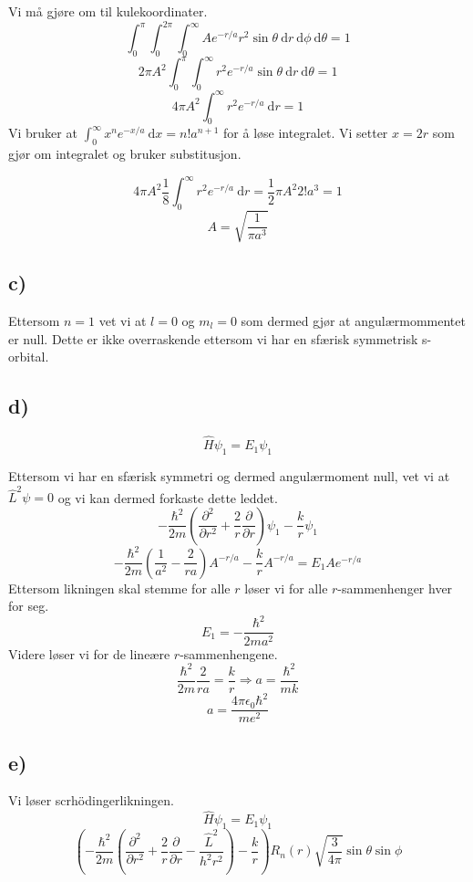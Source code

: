 \documentclass{article}
\begin{document}
Vi må gjøre om til kulekoordinater. 
\[
∫_{0}^{π} ∫_{0}^{2π} ∫_{0}^{∞} A e^{- r / a}r^2 \sin θ \ \mathrm{d}r \ \mathrm{d}ϕ \ \mathrm{d}θ = 1
\]
\[
2πA^2 ∫_{0}^{π} ∫_{0}^{∞} r^2 e^{-r / a} \sin θ \ \mathrm{d}r \ \mathrm{d}θ = 1
\]
\[
4πA^2 ∫_{0}^{∞} r^2 e^{-r / a} \ \mathrm{d}r = 1
\]
Vi bruker at $∫_{0}^{∞} x^{n} e^{- x / a} \ \mathrm{d}x = n! a^{n + 1}$ for å løse integralet. Vi setter $x = 2r$ som gjør om integralet og bruker substitusjon. 

\[
4πA^2 \frac{1}{8} ∫_{0}^{∞} r^2 e^{-r / a} \ \mathrm{d}r = \frac{1}{2} πA^2 2! a^3 = 1
\]
\[
A = \sqrt{\frac{1}{πa^3}}
\]


\subsection*{c)}
Ettersom $n=1$ vet vi at $l=0$ og $m_l=0$ som dermed gjør at angulærmommentet er null. Dette er ikke overraskende ettersom vi har en sfærisk symmetrisk s-orbital.


\subsection*{d)}
\[
\hat{H} ψ_{1} = E_1 ψ_{1}
\]

Ettersom vi har en sfærisk symmetri og dermed angulærmoment null, vet vi at $\hat{L}^2 ψ = 0$ og vi kan dermed forkaste dette leddet. 
\[
- \frac{ℏ^2}{2m} \left(\frac{∂^2 }{∂ r^2} + \frac{2}{r} \frac{∂ }{∂ r}\right)ψ_1 - \frac{k}{r}ψ_1
\]
\[
- \frac{ℏ^2}{2m}\left(\frac{1}{a^2} - \frac{2}{ra}\right)A^{- r / a} - \frac{k}{r}A^{- r/ a} = E_1 Ae^{- r / a}
\]
Ettersom likningen skal stemme for alle $r$ løser vi for alle $r$-sammenhenger hver for seg. 
\[
E_1 = - \frac{ℏ^2}{2ma^2}
\]
Videre løser vi for de lineære $r$-sammenhengene. 
\[
\frac{ℏ^2}{2m} \frac{2}{ra} = \frac{k}{r} ⇒ a = \frac{ℏ^2}{mk} 
\]
\[
a = \frac{4πϵ_0ℏ^2}{me^2}
\]



\subsection*{e)}
Vi løser scrhödingerlikningen. 
\[
\hat{H} ψ_{1} = E_1 ψ_{1}
\]
\[
\left(- \frac{ℏ^2}{2m} \left(\frac{∂^2 }{∂ r^2} + \frac{2}{r}\frac{∂ }{∂ r} - \frac{\hat{L}^2}{h^2r^2}\right) - \frac{k}{r}\right) R_n(r)\sqrt{\frac{3}{4π}}\sin θ \sin ϕ
\]
  
\end{document}
